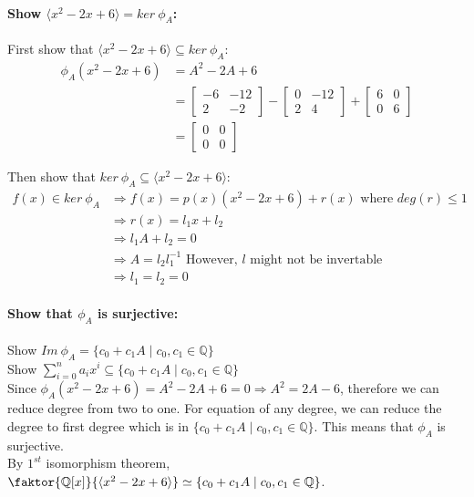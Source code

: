 \documentclass[12pt]{article}
\begin{document}
\begin{enumerate}
		\paragraph{Show $\langle x^2 - 2x + 6\rangle = ker\ \phi_A$:} $\ $\\
			First show that $\langle x^2-2x+6\rangle \subseteq ker\ \phi_A$:
			\begin{align*}
				\phi_A(x^2 - 2x + 6) &= A^2 - 2A + 6\\
														 &= \begin{bmatrix}-6 & -12 \\ 2 & -2\end{bmatrix} -
																\begin{bmatrix}0 & -12 \\ 2 & 4\end{bmatrix} +
																\begin{bmatrix}6 & 0 \\ 0 & 6\end{bmatrix}\\
														 &= \begin{bmatrix}0 & 0 \\ 0 & 0\end{bmatrix}
			\end{align*}

			Then show that $ker\ \phi_A \subseteq \langle x^2-2x+6\rangle$:
			\begin{align*}
				f(x) \in ker\ \phi_A &\Rightarrow f(x) = p(x)(x^2 - 2x + 6) + r(x)
				\text{ where $deg(r) \le 1$}\\
				&\Rightarrow r(x) = l_1 x + l_2 \\
				&\Rightarrow l_1A + l_2 = 0\\
				&\Rightarrow A = l_2 l_1^{-1} \text{ However, $l$ might not be invertable}\\
				&\Rightarrow l_1 = l_2 = 0
			\end{align*}

		\paragraph{Show that $\phi_A$ is surjective:}Show $Im\ \phi_A = \{c_0 +
			c_1A \mid c_0, c_1 \in \mathbb{Q}\}$\\
			Show $\sum^n_{i=0}a_ix^i \subseteq \{c_0 + c_1A \mid c_0, c_1 \in
				\mathbb{Q}\}$ \\
			Since $\phi_A(x^2 -2x + 6) = A^2 - 2A + 6 = 0 \Rightarrow A^2 = 2A - 6
			$, therefore we can reduce degree from two to one. For equation of any
			degree, we can reduce the degree to first degree which is in $\{c_0 +
			c_1A \mid c_0, c_1 \in \mathbb{Q}\}$. This means that $\phi_A$ is
			surjective. \\

		By $1^{st}$ isomorphism theorem, $\faktor{\mathbb{Q}[x]}{\langle x^2-2x+6\rangle} \simeq
		\{c_0 + c_1A \mid c_0, c_1 \in \mathbb{Q}\}$.

\end{enumerate}
\end{document}

